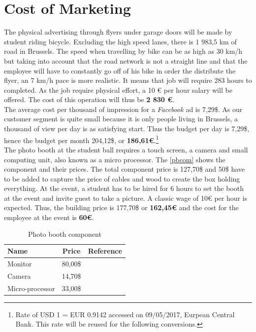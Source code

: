 \documentclass[12pt,a4paper,oneside]{book}
\begin{document}
\section{Cost of Marketing}

The physical advertising through flyers under garage doors will be made by student riding bicycle. Excluding the high speed lanes, there is 1 983,5 km of road in Brussels.\cite{mtvr} The speed when travelling by bike can be as high as 30 km/h but taking into account that the road network is not a straight line and that the employee will have to constantly go off of his bike in order the distribute the flyer, an 7 km/h pace is more realistic. It means that job will require 283 hours to completed. As the job require physical effort, a 10 \euro{} per hour salary will be offered. The cost of this operation will thus be \textbf{2 830 \euro{}}.\\

The average cost per thousand of impression for a \textit{Facebook} ad is 7,29\$.\cite{fbad} As our customer segment is quite small because it is only people living in Brussels, a thousand of view per day is as satisfying start. Thus the budget per day is 7,29\$, hence the budget per month 204,12\$, or \textbf{186,61\euro{}}.\footnote{Rate of USD 1 = EUR 0.9142 accessed on 09/05/2017, Eurpean Central Bank. This rate will be reused for the following conversions.}\\

The photo booth at the student ball requires a touch screen, a camera and small computing unit, also known as a micro processor. The \autoref{pbcom} shows the component and their prices. The total component price is 127,70\$ and 50\$ have to be added to capture the price of cables and wood to create the box holding everything. At the event, a student has to be hired for 6 hours to set the booth at the event and invite guest to take a picture. A classic wage of 10\euro{} per hour is expected. Thus, the building price is 177,70\$ or \textbf{162,45\euro{}} and the cost for the employee at the event is \textbf{60\euro{}}.\\

\begin{table}[h]
\centering
\caption{Photo booth component}
\label{pbcom}
\begin{tabular}{|l|c|c|}
\hline
\textbf{Name}   & \textbf{Price} & \textbf{Reference} \\ \hline
Monitor         & 80,00\$         & \cite{abmon}    \\ \hline
Camera          & 14,70\$         & \cite{abcam}     \\ \hline
Micro-processor & 33,00\$         & \cite{abmc}     \\ \hline
\end{tabular}
\end{table}
\end{document}
